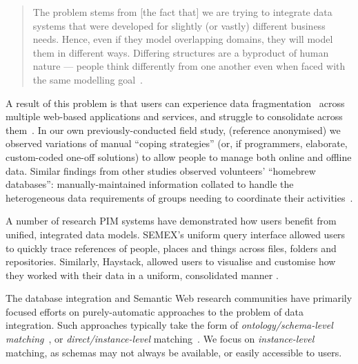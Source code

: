 \documentclass{sigchi}
\begin{document}
\begin{quote} 
The problem stems from [the fact that] we are trying to integrate data systems that were developed for slightly (or vastly) different business needs. Hence, even if they model overlapping domains, they will model them in different ways. Differing structures are a byproduct of human nature --- people think differently from one another even when faced with the same modelling goal~\cite{halevy2006data}.
\end{quote}

A result of this problem is that users can experience data fragmentation~\cite{Jones05towardsa} across multiple web-based applications and services, and struggle to consolidate across them~\cite{bergman,boardmansasse}.  In our own previously-conducted field study, (reference anonymised) we observed variations of manual ``coping strategies'' (or, if programmers, elaborate, custom-coded one-off solutions) to allow people to manage both online and offline data.  Similar findings from other studies observed volunteers' ``homebrew databases'': manually-maintained information collated to handle the heterogeneous data requirements of groups needing to coordinate their activities~\cite{Voida:2011:HDC:1978942.1979078}.

A number of research PIM systems have demonstrated how users benefit from unified, integrated data models.  SEMEX's \cite{semex} uniform query interface allowed users to quickly trace references of people, places and things across files, folders and repositories.  Similarly, Haystack, allowed users to visualise and customise how they worked with their data in a uniform, consolidated manner \cite{haystack}. 

The database integration and Semantic Web \cite{Shadbolt:2006:SWR:1155313.1155373} research communities have primarily focused efforts on purely-automatic approaches to the problem of data integration.  Such approaches typically take the form of \emph{ontology/schema-level matching}~\cite{euzenat2004api,doan2003learning}, or \emph{direct/instance-level} matching~\cite{suchanek2011paris,castano2006matching}.  We focus on \emph{instance-level} matching, as schemas may not always be available, or easily accessible to users.
\end{document}
